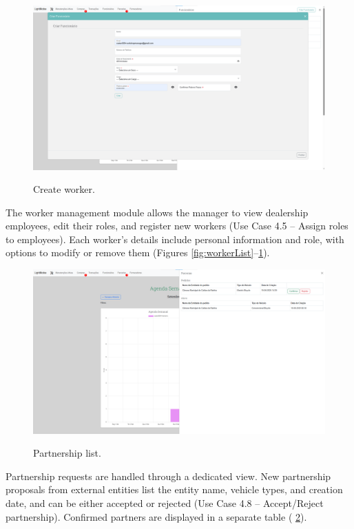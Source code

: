 \begin{figure}[h]
  \caption{Create worker.}
  \centering
  \includegraphics[width=\textwidth]{figs/Implementation/workshopmanager/workerCreate}
  \label{fig:workerCreate}
\end{figure}


The worker management module allows the manager to view dealership employees, edit their roles, and register new workers (Use Case 4.5 – Assign roles to employees). Each worker's details include personal information and role, with options to modify or remove them (Figures \ref{fig:workerList}–\ref{fig:workerCreate}).


\begin{figure}[h]
  \caption{Partnership list.}
  \centering
  \includegraphics[width=\textwidth]{figs/Implementation/workshopmanager/partnershipList}
  \label{fig:partnershipList}
\end{figure}


Partnership requests are handled through a dedicated view. New partnership proposals from external entities list the entity name, vehicle types, and creation date, and can be either accepted or rejected (Use Case 4.8 – Accept/Reject partnership). Confirmed partners are displayed in a separate table ( \ref{fig:partnershipList}).

